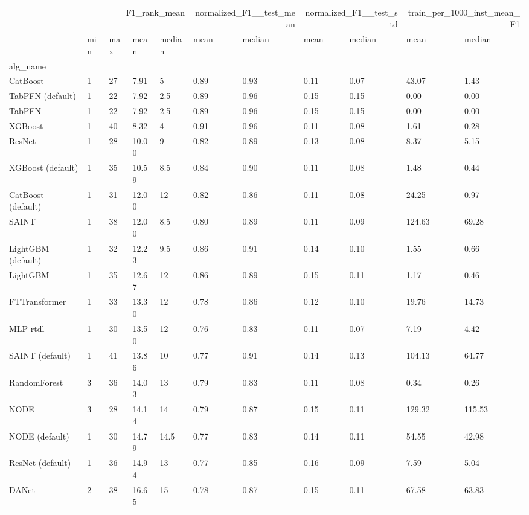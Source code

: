 \begin{tabular}{lllllllllll}
\toprule
 & \multicolumn{4}{r}{F1_rank_mean} & \multicolumn{2}{r}{normalized_F1__test_mean} & \multicolumn{2}{r}{normalized_F1__test_std} & \multicolumn{2}{r}{train_per_1000_inst_mean_F1} \\
 & min & max & mean & median & mean & median & mean & median & mean & median \\
alg_name &  &  &  &  &  &  &  &  &  &  \\
\midrule
CatBoost & 1 & 27 & 7.91 & 5 & 0.89 & 0.93 & 0.11 & 0.07 & 43.07 & 1.43 \\
TabPFN (default) & 1 & 22 & 7.92 & 2.5 & 0.89 & 0.96 & 0.15 & 0.15 & 0.00 & 0.00 \\
TabPFN & 1 & 22 & 7.92 & 2.5 & 0.89 & 0.96 & 0.15 & 0.15 & 0.00 & 0.00 \\
XGBoost & 1 & 40 & 8.32 & 4 & 0.91 & 0.96 & 0.11 & 0.08 & 1.61 & 0.28 \\
ResNet & 1 & 28 & 10.00 & 9 & 0.82 & 0.89 & 0.13 & 0.08 & 8.37 & 5.15 \\
XGBoost (default) & 1 & 35 & 10.59 & 8.5 & 0.84 & 0.90 & 0.11 & 0.08 & 1.48 & 0.44 \\
CatBoost (default) & 1 & 31 & 12.00 & 12 & 0.82 & 0.86 & 0.11 & 0.08 & 24.25 & 0.97 \\
SAINT & 1 & 38 & 12.00 & 8.5 & 0.80 & 0.89 & 0.11 & 0.09 & 124.63 & 69.28 \\
LightGBM (default) & 1 & 32 & 12.23 & 9.5 & 0.86 & 0.91 & 0.14 & 0.10 & 1.55 & 0.66 \\
LightGBM & 1 & 35 & 12.67 & 12 & 0.86 & 0.89 & 0.15 & 0.11 & 1.17 & 0.46 \\
FTTransformer & 1 & 33 & 13.30 & 12 & 0.78 & 0.86 & 0.12 & 0.10 & 19.76 & 14.73 \\
MLP-rtdl & 1 & 30 & 13.50 & 12 & 0.76 & 0.83 & 0.11 & 0.07 & 7.19 & 4.42 \\
SAINT (default) & 1 & 41 & 13.86 & 10 & 0.77 & 0.91 & 0.14 & 0.13 & 104.13 & 64.77 \\
RandomForest & 3 & 36 & 14.03 & 13 & 0.79 & 0.83 & 0.11 & 0.08 & 0.34 & 0.26 \\
NODE & 3 & 28 & 14.14 & 14 & 0.79 & 0.87 & 0.15 & 0.11 & 129.32 & 115.53 \\
NODE (default) & 1 & 30 & 14.79 & 14.5 & 0.77 & 0.83 & 0.14 & 0.11 & 54.55 & 42.98 \\
ResNet (default) & 1 & 36 & 14.94 & 13 & 0.77 & 0.85 & 0.16 & 0.09 & 7.59 & 5.04 \\
DANet & 2 & 38 & 16.65 & 15 & 0.78 & 0.87 & 0.15 & 0.11 & 67.58 & 63.83 \\

\end{tabular}
